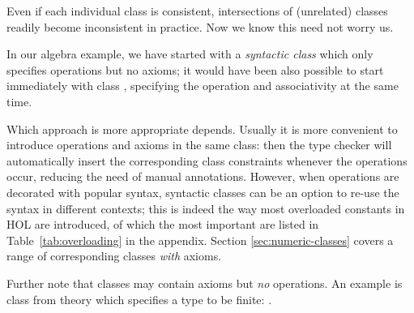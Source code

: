 \begin{isabellebody}
\begin{isamarkuptext}
Even if each individual class is consistent, intersections of
(unrelated) classes readily become inconsistent in practice. Now we
know this need not worry us.%
\end{isamarkuptext}%
\isamarkuptrue%
%
\isamarkuptrue%
%
\begin{isamarkuptext}%
In our algebra example, we have started with a \emph{syntactic
class}  which only specifies operations but no axioms; it
would have been also possible to start immediately with class , specifying the  operation and associativity at
the same time.

Which approach is more appropriate depends.  Usually it is more
convenient to introduce operations and axioms in the same class: then
the type checker will automatically insert the corresponding class
constraints whenever the operations occur, reducing the need of manual
annotations.  However, when operations are decorated with popular
syntax, syntactic classes can be an option to re-use the syntax in
different contexts; this is indeed the way most overloaded constants
in HOL are introduced, of which the most important are listed in
Table~\ref{tab:overloading} in the appendix.  Section
\ref{sec:numeric-classes} covers a range of corresponding classes
\emph{with} axioms.

Further note that classes may contain axioms but \emph{no} operations.
An example is class  from theory \hyperlink{theory.Finite-Set}{\mbox{}}
which specifies a type to be finite: .%
\end{isamarkuptext}%
\isamarkuptrue%
%
\isadelimtheory
%
\endisadelimtheory
%
\isatagtheory
%
\endisatagtheory
{\isafoldtheory}%
%
\isadelimtheory
%
\endisadelimtheory
\end{isabellebody}%
